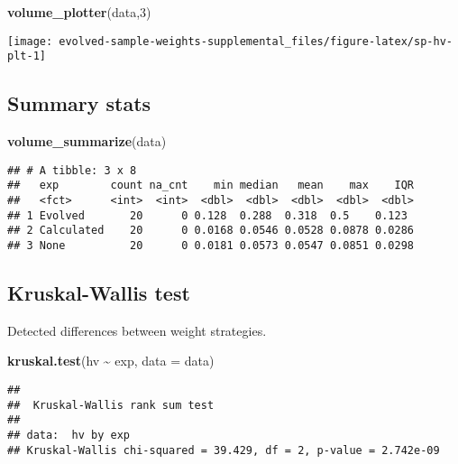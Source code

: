 \documentclass[
]{book}
\newenvironment{Shaded}{\begin{snugshade}}{\end{snugshade}}
\newcommand{\AttributeTok}[1]{\textcolor[rgb]{0.13,0.29,0.53}{#1}}
\newcommand{\DecValTok}[1]{\textcolor[rgb]{0.00,0.00,0.81}{#1}}
\newcommand{\FunctionTok}[1]{\textcolor[rgb]{0.13,0.29,0.53}{\textbf{#1}}}
\newcommand{\NormalTok}[1]{#1}
\newcommand{\SpecialCharTok}[1]{\textcolor[rgb]{0.81,0.36,0.00}{\textbf{#1}}}
\begin{document}
\begin{Shaded}
\begin{Highlighting}[]
\FunctionTok{volume\_plotter}\NormalTok{(data,}\DecValTok{3}\NormalTok{)}
\end{Highlighting}
\end{Shaded}

\texttt{[image: evolved-sample-weights-supplemental\_files/figure-latex/sp-hv-plt-1]}

\hypertarget{summary-stats-2}{%
\subsection{Summary stats}\label{summary-stats-2}}

\begin{Shaded}
\begin{Highlighting}[]
\FunctionTok{volume\_summarize}\NormalTok{(data)}
\end{Highlighting}
\end{Shaded}

\begin{verbatim}
## # A tibble: 3 x 8
##   exp        count na_cnt    min median   mean    max    IQR
##   <fct>      <int>  <int>  <dbl>  <dbl>  <dbl>  <dbl>  <dbl>
## 1 Evolved       20      0 0.128  0.288  0.318  0.5    0.123 
## 2 Calculated    20      0 0.0168 0.0546 0.0528 0.0878 0.0286
## 3 None          20      0 0.0181 0.0573 0.0547 0.0851 0.0298
\end{verbatim}

\hypertarget{kruskal-wallis-test-2}{%
\subsection{Kruskal-Wallis test}\label{kruskal-wallis-test-2}}

Detected differences between weight strategies.

\begin{Shaded}
\begin{Highlighting}[]
\FunctionTok{kruskal.test}\NormalTok{(hv }\SpecialCharTok{\textasciitilde{}}\NormalTok{ exp, }\AttributeTok{data =}\NormalTok{ data)}
\end{Highlighting}
\end{Shaded}

\begin{verbatim}
## 
##  Kruskal-Wallis rank sum test
## 
## data:  hv by exp
## Kruskal-Wallis chi-squared = 39.429, df = 2, p-value = 2.742e-09
\end{verbatim}
\end{document}
